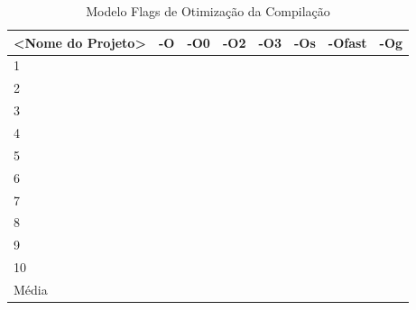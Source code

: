 \begin{table}[!ht]
\centering
\caption{Modelo Flags de Otimização da Compilação}
\label{tab:modelo_otimizacao_compilacao}
\begin{tabular}{llllllll}
\textbf{<Nome do Projeto>} & \textbf{-O} & \textbf{-O0} & \textbf{-O2} & \textbf{-O3} & \textbf{-Os} & \textbf{-Ofast} & \textbf{-Og} \\ \toprule
1                          &             &              &              &              &              &                 &        \\ 
2                          &             &              &              &              &              &                 &        \\ 
3                          &             &              &              &              &              &                 &        \\ 
4                          &             &              &              &              &              &                 &        \\ 
5                          &             &              &              &              &              &                 &        \\ 
6                          &             &              &              &              &              &                 &        \\ 
7                          &             &              &              &              &              &                 &        \\ 
8                          &             &              &              &              &              &                 &        \\ 
9                          &             &              &              &              &              &                 &        \\ 
10                         &             &              &              &              &              &                 &        \\ \bottomrule
Média                      &             &              &              &              &              &                 &        \\ 
\end{tabular}
\end{table}

